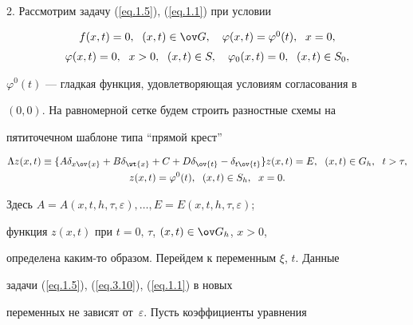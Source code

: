 2. Рассмотрим задачу (\ref{eq.1.5}), (\ref{eq.1.1}) при условии


\begin{equation}


\label{eq.3.10}


\begin{array}{c}


f(x, t)=0, \ \; (x, t)\in \ov G, \quad \varphi(x, t)=\varphi^0(t),


\ \; x=0, \\[2mm]


\varphi(x, t)=0, \ \; x> 0, \ \; (x, t)\in S, \quad


\varphi_0(x, t)=0, \ \; (x, t)\in S_0,


\end{array}


\end{equation}


$\varphi^0(t)$ --- гладкая функция, удовлетворяющая условиям согласования в


$(0,0)$. На равномерной сетке будем строить разностные схемы на


пятиточечном шаблоне типа ``прямой крест''


\begin{gather}


\label{eq.3.11}


\Lambda z(x,t)\equiv \{A \delta_{x\ov{x}}+B \delta_{\wt{x}}+C+D


\delta_{\ov{t}}-\delta_{t\ov{t}}\} z(x, t)=E, \ \; (x, t)\in G_h,


\ \; t>\tau, \\


%


\label{eq.3.12}


z(x, t)=\varphi^0(t), \ \; (x, t)\in S_h, \ \; x=0.


\end{gather}


Здесь $A=A(x,t,h, \tau, \varepsilon), \dotsc,


E=E(x, t, h, \tau, \varepsilon)$;


функция $z(x,t)$ при $t=0,\,\tau$, $(x,t)\in \ov G_h$, $x> 0$,


определена каким-то образом. Перейдем к переменным $\xi$, $t$. Данные


задачи (\ref{eq.1.5}), (\ref{eq.3.10}), (\ref{eq.1.1}) в новых


переменных не зависят от~$\varepsilon$. Пусть коэффициенты уравнения


